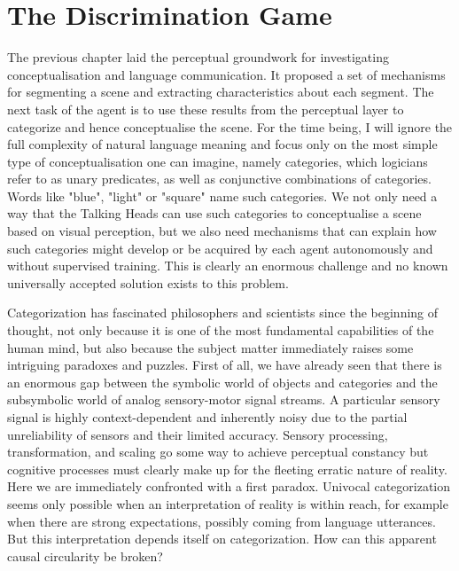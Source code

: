 \chapter{The Discrimination Game}

The previous chapter laid the perceptual groundwork 
for investigating conceptualisation and language 
communication. It proposed a set of mechanisms for segmenting a 
scene and extracting characteristics about each 
segment. The next task of the agent is to use these results
from the perceptual layer to categorize 
and hence conceptualise the
scene. For the time being, I will 
ignore the full complexity of natural
language meaning and focus only on the most 
simple type of conceptualisation one can
imagine, namely categories, which logicians refer 
to as unary predicates, as well as conjunctive 
combinations of categories. Words like "blue", "light" or
"square" name such categories. We not only need a way 
that the Talking Heads can use such categories to conceptualise
a scene based on visual perception, but we also need 
mechanisms that can explain how such categories might 
develop or be acquired by each agent autonomously and 
without supervised training. This is clearly an enormous
challenge and no known universally accepted solution 
exists to this problem.

Categorization has fascinated philosophers and scientists
since the beginning of thought, not only because it is one
of the most fundamental capabilities of the human mind, 
but also because the subject matter immediately raises 
some intriguing paradoxes and puzzles. First of all, 
we have already seen that there is an enormous 
gap between the symbolic world of objects and categories
and the subsymbolic world of analog sensory-motor signal streams. 
A particular sensory signal is highly context-dependent and
inherently noisy due to the partial
unreliability of sensors and their limited accuracy. 
Sensory processing, transformation, and scaling 
go some way to achieve perceptual constancy
but cognitive processes must clearly make up for
the fleeting erratic nature of reality. 
Here we are immediately confronted with a first paradox. 
Univocal categorization seems only possible when 
an interpretation of reality is within reach, for example
when there are strong expectations, possibly coming 
from language utterances. But this interpretation
depends itself on categorization. How can this apparent
causal circularity be broken? 

